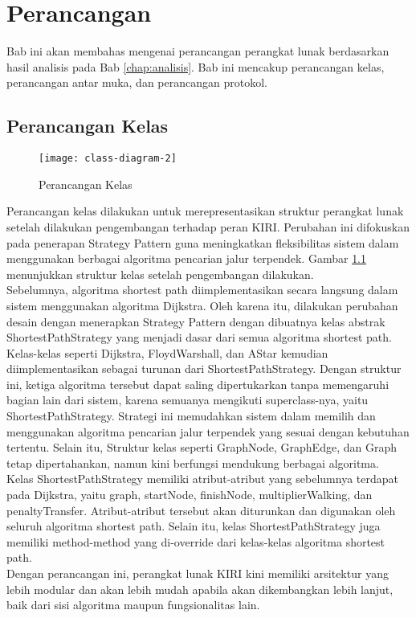 \chapter{Perancangan}
\label{chap:perancangan}
Bab ini akan membahas mengenai perancangan perangkat lunak berdasarkan hasil analisis pada Bab \ref{chap:analisis}. Bab ini mencakup perancangan kelas, perancangan antar muka, dan perancangan protokol.
\section{Perancangan Kelas}
\label{sec:rancangandiagramkelas}

\begin{figure}[H] 
    \centering  
    \texttt{[image: class-diagram-2]}  
    \caption{Perancangan Kelas}
    \label{fig:rancangandiagramkelas} 
\end{figure}

\noindent
Perancangan kelas dilakukan untuk merepresentasikan struktur perangkat lunak setelah dilakukan pengembangan terhadap peran KIRI. Perubahan ini difokuskan pada penerapan Strategy Pattern guna meningkatkan fleksibilitas sistem dalam menggunakan berbagai algoritma pencarian jalur terpendek. Gambar \ref{fig:rancangandiagramkelas} menunjukkan struktur kelas setelah pengembangan dilakukan.
\\
Sebelumnya, algoritma shortest path diimplementasikan secara langsung dalam sistem menggunakan algoritma Dijkstra. Oleh karena itu, dilakukan perubahan desain dengan menerapkan Strategy Pattern dengan dibuatnya kelas abstrak ShortestPathStrategy yang menjadi dasar dari semua algoritma shortest path. Kelas-kelas seperti Dijkstra, FloydWarshall, dan AStar kemudian diimplementasikan sebagai turunan dari ShortestPathStrategy. Dengan struktur ini, ketiga algoritma tersebut dapat saling dipertukarkan tanpa memengaruhi bagian lain dari sistem, karena semuanya mengikuti superclass-nya, yaitu ShortestPathStrategy. Strategi ini memudahkan sistem dalam memilih dan menggunakan algoritma pencarian jalur terpendek yang sesuai dengan kebutuhan tertentu. Selain itu, Struktur kelas seperti GraphNode, GraphEdge, dan Graph tetap dipertahankan, namun kini berfungsi mendukung berbagai algoritma.
\\
Kelas ShortestPathStrategy memiliki atribut-atribut yang sebelumnya terdapat pada Dijkstra, yaitu graph, startNode, finishNode, multiplierWalking, dan penaltyTransfer. Atribut-atribut tersebut akan diturunkan dan digunakan oleh seluruh algoritma shortest path. Selain itu, kelas ShortestPathStrategy juga memiliki method-method yang di-override dari kelas-kelas algoritma shortest path.
\\
Dengan perancangan ini, perangkat lunak KIRI kini memiliki arsitektur yang lebih modular dan akan lebih mudah apabila akan dikembangkan lebih lanjut, baik dari sisi algoritma maupun fungsionalitas lain.


